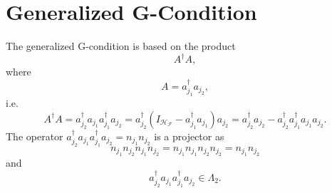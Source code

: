 \documentclass[aps,preprint]{revtex4}%
\begin{document}
\section{Generalized G-Condition}

The generalized G-condition is based on the product
\begin{equation}
A^{\dagger}A,
\end{equation}
where
\begin{equation}
A=a_{j_{1}}^{\dagger}a_{j_{2}},
\end{equation}
i.e.%
\begin{equation}
A^{\dagger}A=a_{j_{2}}^{\dagger}a_{j_{1}}a_{j_{1}}^{\dagger}a_{j_{2}}%
=a_{j_{2}}^{\dagger}\left(  I_{\mathcal{H}_{\mathcal{F}}}-a_{j_{1}}^{\dagger
}a_{j_{1}}\right)  a_{j_{2}}=a_{j_{2}}^{\dagger}a_{j_{2}}-a_{j_{2}}^{\dagger
}a_{j_{1}}^{\dagger}a_{j_{1}}a_{j_{2}}.
\end{equation}
The operator $a_{j_{2}}^{\dagger}a_{j_{1}}a_{j_{1}}^{\dagger}a_{j_{2}%
}=n_{j_{1}}n_{j_{2}}$ is a projector as
\begin{equation}
n_{j_{1}}n_{j_{2}}n_{j_{1}}n_{j_{2}}=n_{j_{1}}n_{j_{1}}n_{j_{2}}n_{j_{2}%
}=n_{j_{1}}n_{j_{2}}%
\end{equation}
and
\begin{equation}
a_{j_{2}}^{\dagger}a_{j_{1}}a_{j_{1}}^{\dagger}a_{j_{2}}\in\Lambda_{2}.
\end{equation}
\end{document}
